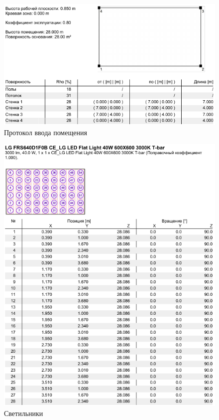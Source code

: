 \begin{figure}[p]
\centering
\includegraphics[width=\textwidth]{lights_3}
\caption{Протокол ввода помещения}
\label{pic:light_3}
\end{figure}
\begin{figure}[p]
\centering
\includegraphics[width=\textwidth]{lights_4}
\caption{Светильники}
\label{pic:light_4}
\end{figure}
